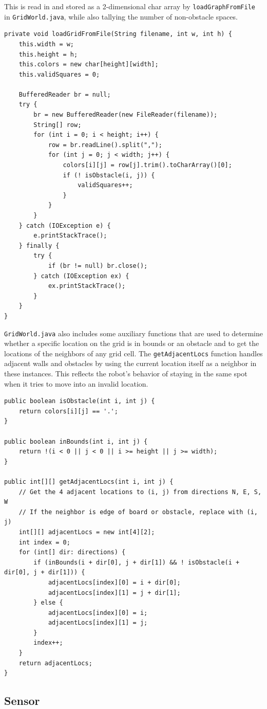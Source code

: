 \documentclass{article}
\begin{document}
This is read in and stored as a 2-dimensional char array by \verb`loadGraphFromFile` in \verb`GridWorld.java`, while also tallying the number of non-obstacle spaces.

\begin{lstlisting}
private void loadGridFromFile(String filename, int w, int h) {
	this.width = w;
	this.height = h;
	this.colors = new char[height][width];
	this.validSquares = 0;
	
	BufferedReader br = null;
	try {
		br = new BufferedReader(new FileReader(filename));
		String[] row;
		for (int i = 0; i < height; i++) {
			row = br.readLine().split(",");
			for (int j = 0; j < width; j++) {
				colors[i][j] = row[j].trim().toCharArray()[0];
				if (! isObstacle(i, j)) {
					validSquares++;
				}
			}
		}
	} catch (IOException e) {
		e.printStackTrace();
	} finally {
		try {
			if (br != null) br.close();
		} catch (IOException ex) {
			ex.printStackTrace();
		}
	}
}
\end{lstlisting}

\verb`GridWorld.java` also includes some auxiliary functions that are used to determine whether a specific location on the grid is in bounds or an obstacle and to get the locations of the neighbors of any grid cell. The \verb`getAdjacentLocs` function handles adjacent walls and obstacles by using the current location itself as a neighbor in these instances. This reflects the robot's behavior of staying in the same spot when it tries to move into an invalid location. 

\begin{lstlisting}
public boolean isObstacle(int i, int j) {
	return colors[i][j] == '.';
}

public boolean inBounds(int i, int j) {
	return !(i < 0 || j < 0 || i >= height || j >= width);
}

public int[][] getAdjacentLocs(int i, int j) {
	// Get the 4 adjacent locations to (i, j) from directions N, E, S, W
	// If the neighbor is edge of board or obstacle, replace with (i, j)
	int[][] adjacentLocs = new int[4][2];
	int index = 0;
	for (int[] dir: directions) {
		if (inBounds(i + dir[0], j + dir[1]) && ! isObstacle(i + dir[0], j + dir[1])) {
			adjacentLocs[index][0] = i + dir[0];
			adjacentLocs[index][1] = j + dir[1];
		} else {
			adjacentLocs[index][0] = i;
			adjacentLocs[index][1] = j;
		}
		index++;
	}
	return adjacentLocs;
}
\end{lstlisting}

\subsection{Sensor}
\end{document}
